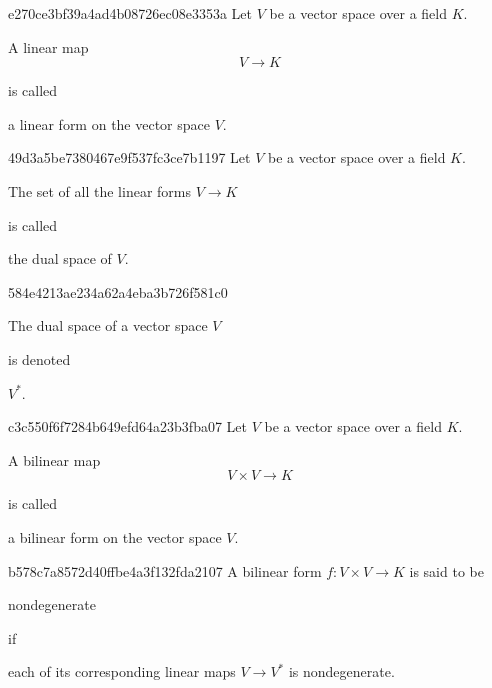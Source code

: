 \begin{note}{e270ce3bf39a4ad4b08726ec08e3353a}
    Let \( V \) be a vector space over a field \( K \). \begin{icloze}{1}A linear map
    \[
        V \to K
    \]\end{icloze}
    is called \begin{icloze}{2}a linear form on the vector space \( V \).\end{icloze}
\end{note}

\begin{note}{49d3a5be7380467e9f537fc3ce7b1197}
    Let \( V \) be a vector space over a field \( K \). \begin{icloze}{1}The set of all the linear forms \( V \to K \)\end{icloze} is called \begin{icloze}{2}the dual space of \( V \).\end{icloze}
\end{note}

\begin{note}{584e4213ae234a62a4eba3b726f581c0}
    \begin{icloze}{1}The dual space of a vector space \( V \)\end{icloze} is denoted \begin{icloze}{2}\( V^{*} \).\end{icloze}
\end{note}

\begin{note}{c3c550f6f7284b649efd64a23b3fba07}
    Let \( V \) be a vector space over a field \( K \). \begin{icloze}{1}A bilinear map
    \[
        V \times V \to K
    \]\end{icloze}
    is called \begin{icloze}{2}a bilinear form on the vector space \( V \).\end{icloze}
\end{note}

\begin{note}{b578c7a8572d40ffbe4a3f132fda2107}
    A bilinear form \( f : V \times V \to K \) is said to be \begin{icloze}{2}nondegenerate\end{icloze} if \begin{icloze}{1}each of its corresponding linear maps \( V \to V^{*} \) is nondegenerate.\end{icloze}
\end{note}

